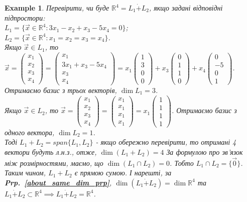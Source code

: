 \documentclass[a4paper, 10pt]{article}
\theoremstyle{theoremdd}
\newtheorem{example}[theorem]{Example}
\newcommand\prpref[1]{\textbf{Prp.~\ref{#1}}}
\begin{document}
	\begin{example}
	Перевірити, чи буде $\mathbb{R}^4 = L_1 \dot{+} L_2$, якщо задані відповідні підпростори:\\
	$L_1 = \{\vec{x} \in \mathbb{R}^4: 3x_1 - x_2 + x_3 - 5x_4 = 0\}$;\\
	$L_2 = \{\vec{x} \in \mathbb{R}^4: x_1 = x_2 = x_3 = x_4\}$.\\
	Якщо $\vec{x} \in L_1$, то $\vec{x} = \begin{pmatrix} x_1 \\ x_2 \\ x_3 \\ x_4 \end{pmatrix} = \begin{pmatrix}
	x_1 \\ 3x_1+x_3-5x_4 \\ x_3 \\ x_4
	\end{pmatrix} = x_1 \begin{pmatrix}
	1 \\ 3 \\ 0 \\ 0
	\end{pmatrix} + x_3\begin{pmatrix}
	0 \\ 1 \\ 1 \\ 0
	\end{pmatrix} +  x_4\begin{pmatrix}
	0 \\ -5 \\ 0 \\ 1
	\end{pmatrix}$. Отримаємо базис з трьох векторів, $\dim L_1 = 3$.\\
	Якщо $\vec{x} \in L_2$, то $\vec{x} = \begin{pmatrix} x_1 \\ x_2 \\ x_3 \\ x_4 \end{pmatrix} = \begin{pmatrix} x_1 \\ x_1 \\ x_1 \\ x_1 \end{pmatrix} = x_1 \begin{pmatrix} 1 \\ 1 \\ 1 \\ 1 \end{pmatrix}$. Отримаємо базис з одного вектора, $\dim L_2 = 1$.\\
	Тоді $L_1 + L_2 = span\{L_1,L_2\}$ - якщо обережно перевірити, то отримані 4 вектори будуть л.н.з., отже, $\dim (L_1 + L_2) = 4$ За формулою про зв'язок між розмірностями, маємо, що $\dim{(L_1 \cap L_2)} = 0$. Тобто $L_1 \cap L_2 = \{ \vec{0} \}$.\\
	Таким чином, $L_1 + L_2$ є прямою сумою. І нарешті, за \prpref{about_same_dim_prp}, $\dim{(L_1 \dot{+} L_2)} = \dim {\mathbb{R}^4}$ та \\ $L_1 \dot{+} L_2 \subset \mathbb{R}^4 \implies L_1 \dot{+} L_2 = \mathbb{R}^4$.
	\end{example}
	\newpage	
	
\end{document}
